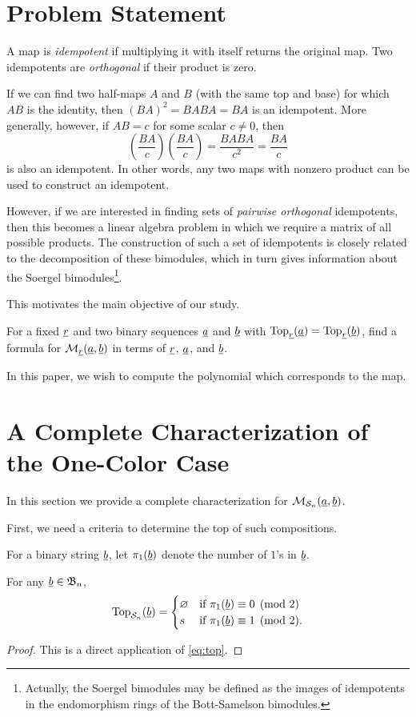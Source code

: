\section{Problem Statement}
\label{sec:probstate}
\begin{definition}
	A map is \emph{idempotent} if multiplying it with itself returns the original map.  Two idempotents are \emph{orthogonal} if their product is zero.
\end{definition}
If we can find two half-maps $A$ and $B$ (with the same top and base) for which $AB$ is the identity, then $(BA)^2=BABA=BA$ is an idempotent.  More generally, however, if $AB = c$ for some scalar $c \neq 0$, then \[ \left( \frac{BA}{c} \right)\left( \frac{BA}{c} \right) = \frac{BABA}{c^2} = \frac{BA}{c} \] is also an idempotent.  In other words, any two maps with nonzero product can be used to construct an idempotent.

However, if we are interested in finding sets of \emph{pairwise orthogonal} idempotents, then this becomes a linear algebra problem in which we require a matrix of all possible products.  The construction of such a set of idempotents is closely related to the decomposition of these bimodules, which in turn gives information about the Soergel bimodules\footnote{Actually, the Soergel bimodules may be defined as the images of idempotents in the endomorphism rings of the Bott-Samelson bimodules.}.

This motivates the main objective of our study.
\begin{ques*}
	For a fixed $\underline{r}$ and two binary sequences $\underline{a}$ and $\underline{b}$ with $\operatorname{Top}_{\underline{r}}(\underline{a}) = \operatorname{Top}_{\underline{r}}(\underline{b})$, find a formula for $\mathcal M_{\underline{r}}(\underline{a}, \underline{b})$ in terms of $\underline{r}$, $\underline{a}$, and $\underline{b}$.
\end{ques*}
In this paper, we wish to compute the polynomial which corresponds to the map.

\section{A Complete Characterization of the One-Color Case}
\label{sec:res_onecolor}
In this section we provide a complete characterization for $\mathcal M_{\mathcal S_n}(\underline{a}, \underline{b})$.  %

First, we need a criteria to determine the top of such compositions.
\begin{definition}
	For a binary string $\underline{b}$, let $\pi_1(\underline{b})$ denote the number of $1$'s in $\underline{b}$.
\end{definition}
\begin{proposition}
	For any $\underline{b} \in \mathfrak B_n$, \[
		\operatorname{Top}_{\mathcal S_n}(\underline{b}) =
		\begin{cases}
			\varnothing & \text{if } \pi_1(\underline{b}) \equiv 0 \pmod{2} \\
			s & \text{if } \pi_1(\underline{b}) \equiv 1 \pmod{2}.
		\end{cases}
		\]
	\label{prop:s_top}
\end{proposition}
\begin{proof}
	This is a direct application of \eqref{eq:top}.
\end{proof}


